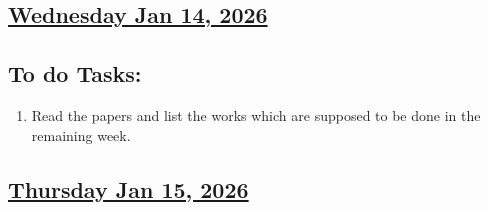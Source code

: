 \subsection*{\underline{Wednesday Jan 14, 2026} }
\subsection*{To do Tasks:}
\begin{enumerate}
    \item Read the papers and list the works which are supposed to be done in the remaining week.\cmark
\end{enumerate}
\subsection*{\underline{Thursday Jan 15, 2026}}
